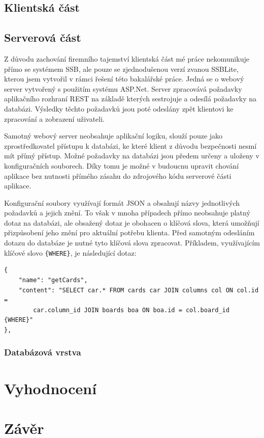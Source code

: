 \section{Klientská část}

\section{Serverová část}

Z důvodu zachování firemního tajemství klientská část mé práce nekomunikuje přímo se systémem SSB, ale pouze se zjednodušenou verzí zvanou SSBLite, kterou jsem vytvořil v rámci řešení této bakalářské práce. Jedná se o webový server vytvořený s použitím systému ASP.Net. Server zpracovává požadavky aplikačního rozhraní REST na základě kterých sestrojuje a odesílá požadavky na databázi. Výsledky těchto požadavků jsou poté odeslány zpět klientovi ke zpracování a zobrazení uživateli.

Samotný webový server neobsahuje aplikační logiku, slouží pouze jako zprostředkovatel přístupu k databázi, ke které klient z důvodu bezpečnosti nesmí mít přímý přístup. Možné požadavky na databázi jsou předem určeny a uloženy v konfiguračních souborech. Díky tomu je možné v budoucnu upravit chování aplikace bez nutnosti přímého zásahu do zdrojového kódu serverové části aplikace. 

Konfigurační soubory využívají formát JSON a obsahují názvy jednotlivých požadavků a jejich znění. To však v mnoha případech přímo neobsahuje platný dotaz na databázi, ale obsažený dotaz je obohacen o klíčová slova, která umožňují přizpůsobení jeho znění pro aktuální potřebu klienta. Před samotným odesláním dotazu do databáze je nutné tyto klíčová slova zpracovat. Příkladem, využívajícím klíčové slovo \texttt{\{WHERE\}}, je následující dotaz:
\begin{verbatim}
{
    "name": "getCards",
    "content": "SELECT car.* FROM cards car JOIN columns col ON col.id = 
        car.column_id JOIN boards boa ON boa.id = col.board_id {WHERE}"
},
\end{verbatim}

\subsection{Databázová vrstva}

\chapter{Vyhodnocení}


\chapter{Závěr}